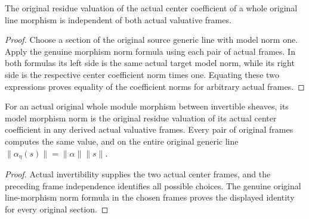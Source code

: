 \begin{lemma}
\label{lem:scheme-line-actual-model-hom-norm-frame-independent}
\leanok
{}
The original residue valuation of the actual center coefficient of
a whole original line morphism is independent of both actual
valuative frames.
\end{lemma}
\begin{proof}
Choose a section of the original source generic line with model norm
one. Apply the genuine morphism norm formula using each pair of
actual frames. In both formulas its left side is the same actual
target model norm, while its right side is the respective center
coefficient norm times one. Equating these two expressions proves
equality of the coefficient norms for arbitrary actual frames.
\end{proof}

\begin{definition}
\label{def:scheme-line-actual-model-hom-norm}
\leanok
{}
For an actual original whole module morphism between invertible
sheaves, its model morphism norm is the original residue valuation
of its actual center coefficient in any derived actual valuative
frames. Every pair of original frames computes the same value, and
on the entire original generic line
$\lVert\alpha_\eta(s)\rVert=\lVert\alpha\rVert\lVert s\rVert$.
\end{definition}
\begin{proof}
Actual invertibility supplies the two actual center frames, and the
preceding frame independence identifies all possible choices.
The genuine original line-morphism norm formula in the chosen
frames proves the displayed identity for every original section.
\end{proof}

